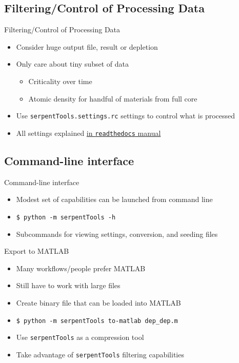 \documentclass{beamer}
\newcommand{\st}{\texttt{serpentTools} }
\begin{document}
\subsection{Filtering/Control of Processing Data}

\begin{frame}{Filtering/Control of Processing Data}
    \begin{itemize}
        \item Consider huge output file, result or depletion
        \item Only care about tiny subset of data
        \begin{itemize}
            \item Criticality over time
            \item Atomic density for handful of materials from full core
        \end{itemize}
        \item Use \texttt{serpentTools.settings.rc} settings to control what is processed
        \item{All settings explained \href{https://serpent-tools.readthedocs.io/en/latest/settingsTop.html}{in \texttt{readthedocs} manual}}
    \end{itemize}
\end{frame}

\subsection{Command-line interface}

\begin{frame}{Command-line interface}
    \begin{itemize}
        \item{Modest set of capabilities can be launched from command line}
        \item{\texttt{\$ python -m serpentTools -h}}
        \item{Subcommands for viewing settings, conversion, and seeding files}
    \end{itemize}
\end{frame}

\begin{frame}{Export to MATLAB}
    \begin{itemize}
        \item Many workflows/people prefer MATLAB
        \item Still have to work with large files
        \item Create binary file that can be loaded into MATLAB
        \item \texttt{\$ python -m serpentTools to-matlab dep\_dep.m}
        \item Use \st as a compression tool
        \item Take advantage of \st filtering capabilities
    \end{itemize}
\end{frame}
\end{document}
